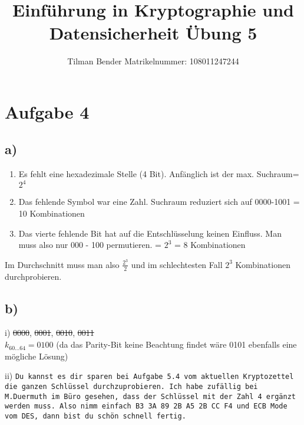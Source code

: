 \documentclass[10pt,a4paper,parskip]{scrartcl}
\author{Tilman Bender   Matrikelnummer: 108011247244\\}
\title{Einführung in Kryptographie und Datensicherheit Übung 5}
\begin{document}
\maketitle

\section*{Aufgabe 4}
\subsection*{a)}
\begin{enumerate}
\item Es fehlt eine hexadezimale Stelle (4 Bit). Anfänglich ist der max. Suchraum=$2^{4}$
\item Das fehlende Symbol war eine Zahl. Suchraum reduziert sich auf 0000-1001 = 10 Kombinationen
\item Das vierte fehlende Bit hat auf die Entschlüsselung keinen Einfluss. Man muss also nur 000 - 100 permutieren. = $2^{3}$ = 8 Kombinationen
\end{enumerate}

Im Durchschnitt muss man also $\frac{2^{3}}{2}$ und im schlechtesten Fall $2^{3}$ Kombinationen durchprobieren.

\subsection*{b)}
i)
\sout{0000}, \sout{0001}, \sout{0010}, \sout{0011}\\
$k_{60\dots64}=0100$ (da das Parity-Bit keine Beachtung findet wäre 0101 ebenfalls eine mögliche Lösung)

ii)
\texttt{{\small Du kannst es dir sparen bei Aufgabe 5.4 vom aktuellen Kryptozettel die ganzen Schlüssel durchzuprobieren.
Ich habe zufällig bei M.Duermuth im Büro gesehen, dass der Schlüssel mit der Zahl 4 ergänzt
werden muss. Also nimm einfach B3 3A 89 2B A5 2B CC F4 und ECB Mode vom DES, dann bist
du schön schnell fertig.}}
\end{document}

